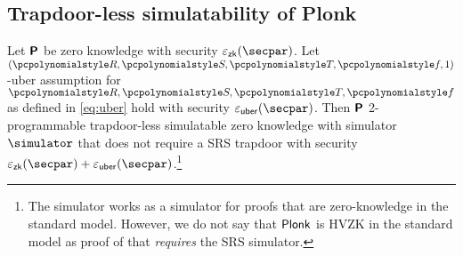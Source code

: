 
\subsection{Trapdoor-less simulatability of Plonk}
\begin{lemma}
  \label{lem:plonk_hvzk}
  Let $\bm{\mathsf{P}}$ be zero knowledge with security $\epszk(\secpar)$. Let
  $(\pR, \pS, \pT, \pf, 1)$-uber assumption for $\pR, \pS, \pT, \pf$ as defined
  in \cref{eq:uber} hold with security $\epsuber(\secpar)$. Then $\bm{\mathsf{P}}$ 2-programmable trapdoor-less simulatable zero knowledge with simulator $\simulator$
  that does not require a SRS trapdoor with security
  $\epszk(\secpar) + \epsuber(\secpar)$.\footnote{The simulator works as a simulator for proofs
    that are zero-knowledge in the standard model. However, we do not say that
    $\textnormal{\textsf{Plonk}}$ is HVZK in the standard model as proof of that \emph{requires} the
    SRS simulator.}
\end{lemma}

